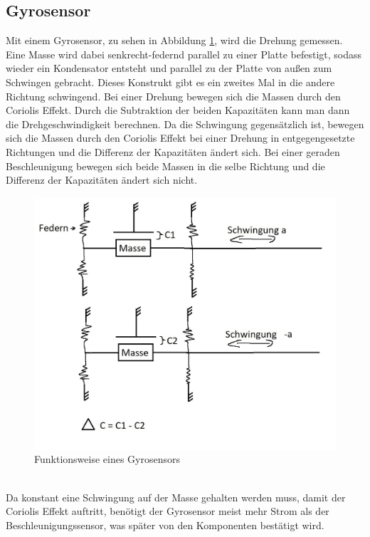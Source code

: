 \subsection{Gyrosensor}
Mit einem Gyrosensor, zu sehen in Abbildung \ref{fig:pic_gyro}, wird die Drehung gemessen.
Eine Masse wird dabei senkrecht-federnd parallel zu einer Platte befestigt, sodass wieder ein Kondensator entsteht und parallel zu der Platte von außen zum Schwingen gebracht.
Dieses Konstrukt gibt es ein zweites Mal in die andere Richtung schwingend.
Bei einer Drehung bewegen sich die Massen durch den Coriolis Effekt.
Durch die Subtraktion der beiden Kapazitäten kann man dann die Drehgeschwindigkeit berechnen.
Da die Schwingung gegensätzlich ist, bewegen sich die Massen durch den Coriolis Effekt bei einer Drehung in entgegengesetzte Richtungen und die Differenz der Kapazitäten ändert sich.
Bei einer geraden Beschleunigung bewegen sich beide Massen in die selbe Richtung und die Differenz der Kapazitäten ändert sich nicht. \cite{gyrosensor}
\begin{figure}[h]
	\centering
	\includegraphics[width=0.65\linewidth]{res/gyro.jpg}
	\caption{Funktionsweise eines Gyrosensors}
	\label{fig:pic_gyro}
\end{figure}\\
Da konstant eine Schwingung auf der Masse gehalten werden muss, damit der Coriolis Effekt auftritt, benötigt der Gyrosensor meist mehr Strom als der Beschleunigungssensor, was später von den Komponenten bestätigt wird.

